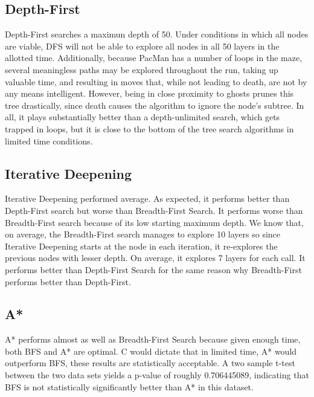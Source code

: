 \documentclass[a4paper]{article}
\begin{document}
\subsection{Depth-First}
Depth-First searches a maximun depth of 50. Under conditions in which all nodes are viable, DFS will not be able to explore all nodes in all 50 layers in the allotted time. Additionally, because PacMan has a number of loops in the maze, several meaningless paths may be explored throughout the run, taking up valuable time, and resulting in moves that, while not leading to death, are not by any means intelligent. However, being in close proximity to ghosts prunes this tree drastically, since death causes the algorithm to ignore the node's subtree. In all, it plays substantially better than a depth-unlimited search, which gets trapped in loops, but it is close to the bottom of the tree search algorithms in limited time conditions.

\subsection{Iterative Deepening}

Iterative Deepening performed average. As expected, it performs better than Depth-First search but worse than Breadth-First Search. It performs worse than Breadth-First search because of its low starting maximum depth. We know that, on average, the Breadth-First search manages to explore 10 layers so since Iterative Deepening starts at the node in each iteration, it re-explores the previous nodes with lesser depth. On average, it explores 7 layers for each call. It performs better than Depth-First Search for the same reason why Breadth-First performs better than Depth-First.   

\subsection{A*} 

A* performs almost as well as Breadth-First Search because given enough time, both BFS and A* are optimal. C would dictate that in limited time, A* would outperform BFS, these results are statistically acceptable. A two sample t-test between the two data sets yields a p-value of roughly 0.706445089, indicating that BFS is not statistically significantly better than A* in this dataset.
\end{document}

